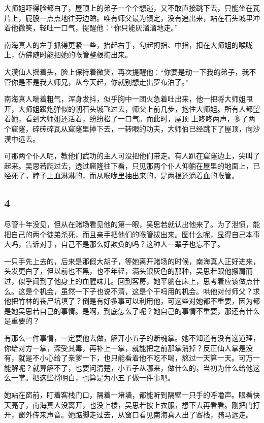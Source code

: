 大师姐吓得脸都白了，屋顶上的弟子一个个想逃，又不敢直接跳下去，只能坐在瓦片上，屁股一点点地往旁边蹭。唯有师父最为镇定，没有追出来，站在石头城里冲着他微笑，轻吐一口气，提醒他：“你只能灰溜溜地走。”

南海真人的左手抓得更紧一些，抬起右手，勾起拇指、中指，扣在大师姐的喉咙上，仿佛随时能把她的喉管整根掏出来。

大漠仙人摇着头，脸上保持着微笑，再次提醒他：“你要是动一下我的弟子，我不管你是不是我大师兄，从今天起，你就别想走出罗布泊了。”

南海真人喘着粗气，浑身发抖，似乎胸中一团火急着吐出来，他一把将大师姐甩开，大师姐跟炮弹似的朝石头城飞过去，师父上前几步，抱住大师姐。所有人都望着她，看到大师姐还活着，纷纷松了一口气。而此时，屋顶
上咚咚两声，多了两个窟窿，碎砖碎瓦从窟窿里掉下去，一转眼的功夫，大师伯已经跳下了屋顶，向沙漠中远去。

可那两个仆人呢，教他们武功的主人可没把他们带走。有人趴在窟窿边上，尖叫了起来。吴思若爬过去，透过窟隆往下看，只见那两个仆人仰躺在屋里的地面上，已经死了，脖子上血淋淋的，而从喉咙里抽出来的，是两根还滴着血的喉管。
\newline

{\centering\subsection{4}}

尽管十年没见，但从在赌场看见他的第一眼，吴思若就认出他来了。为了泄愤，能把自己的两个徒弟杀死，而且亲手把他们的喉管拔出来。图什么呢，显得自己本事大吗，告诉对手，自己不是那么好欺负的吗？这种人一辈子也忘不了。

一只手先上去的，后来是那假大胡子，等她离开赌场的时候，南海真人正好进来，头发更白了，但以前也不黑，也不年轻，满头银灰色的那种，吴思若跟他擦肩而过，似乎闻到了他身上的血腥味儿。回到客房，她平躺在床上，思考着应该做点什么。这是个机会，虽然一下子也说不清，这是个干吗用的机会。哄他对付师父？求他把竹林的丧尸坑填了？倒是有好多事可以利用他，可这些对她都不重要，因为都是她吴思若自己的事情。是啊，到底怎么了呢？她自己的事情不重要，那还有什么是重要的？

有那么一件事情，一定要他去做，解开小五子的断魂掌。她不知道有没有这道理，你给对方一掌，深受其毒，再补上一掌，就能把之前那掌消掉？反正仙人掌是没有，就是不小心给了亲爹一下，也只能看着他不吃不喝，熬过一天算一天。可万一能解呢？就算解不了，也要问清楚，小五子从哪来，做什么的，当初为什么给他这么一掌。把这些捋明白，也算是为小五子做一件事吧。

她站在窗前，盯着客栈门口，隔着一堵墙，都能听到隔壁一只手的呼噜声。眼看快天亮了，南海真人没离开，也没上楼，吴思若披上衣服，想下去再看看。刚把门打开，窗外传来声音。她踮脚走过去，从窗口看见南海真人出了客栈，骑马远走。

